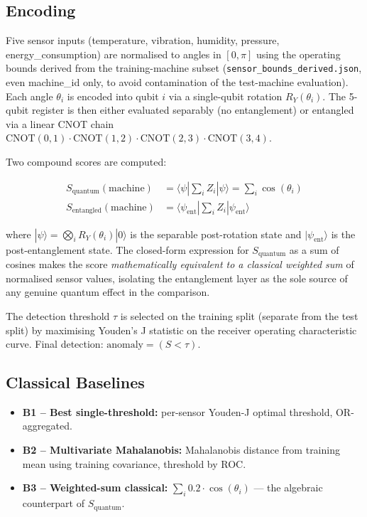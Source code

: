 \subsection{Encoding}

Five sensor inputs (temperature, vibration, humidity, pressure, energy\_consumption) are normalised to angles in $[0, \pi]$ using the operating bounds derived from the training-machine subset (\texttt{sensor\_bounds\_derived.json}, even machine\_id only, to avoid contamination of the test-machine evaluation). Each angle $\theta_i$ is encoded into qubit $i$ via a single-qubit rotation $R_Y(\theta_i)$. The 5-qubit register is then either evaluated separably (no entanglement) or entangled via a linear CNOT chain $\text{CNOT}(0,1) \cdot \text{CNOT}(1,2) \cdot \text{CNOT}(2,3) \cdot \text{CNOT}(3,4)$.

Two compound scores are computed:

\begin{align}
S_{\text{quantum}}(\text{machine}) &= \langle \psi | \sum_i Z_i | \psi \rangle = \sum_i \cos(\theta_i) \\
S_{\text{entangled}}(\text{machine}) &= \langle \psi_{\text{ent}} | \sum_i Z_i | \psi_{\text{ent}} \rangle
\end{align}

where $|\psi\rangle = \bigotimes_i R_Y(\theta_i) |0\rangle$ is the separable post-rotation state and $|\psi_{\text{ent}}\rangle$ is the post-entanglement state. The closed-form expression for $S_{\text{quantum}}$ as a sum of cosines makes the score \emph{mathematically equivalent to a classical weighted sum} of normalised sensor values, isolating the entanglement layer as the sole source of any genuine quantum effect in the comparison.

The detection threshold $\tau$ is selected on the training split (separate from the test split) by maximising Youden's J statistic on the receiver operating characteristic curve. Final detection: $\text{anomaly} = (S < \tau)$.

\subsection{Classical Baselines}

\begin{itemize}
    \item \textbf{B1 -- Best single-threshold:} per-sensor Youden-J optimal threshold, OR-aggregated.
    \item \textbf{B2 -- Multivariate Mahalanobis:} Mahalanobis distance from training mean using training covariance, threshold by ROC.
    \item \textbf{B3 -- Weighted-sum classical:} $\sum_i 0.2 \cdot \cos(\theta_i)$ --- the algebraic counterpart of $S_{\text{quantum}}$.
\end{itemize}


